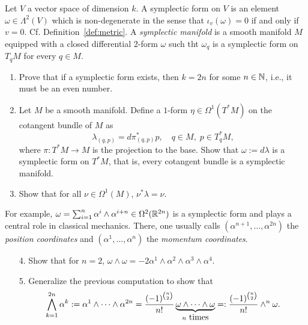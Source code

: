 \begin{exercise}\label{exe:symplectic}
  Let $V$ a vector space of dimension $k$.
  A symplectic form on $V$ is an element $\omega\in\Lambda^2(V)$ which is non-degenerate in the sense that $\iota_v(\omega) = 0$ if and only if $v=0$.
  Cf. Definition~\ref{def:metric}.
  A \emph{symplectic manifold} is a smooth manifold $M$ equipped with a closed differential 2-form $\omega$ such tht $\omega_q$ is a symplectic form on $T_q M$ for every $q\in M$.
  \begin{enumerate}
    \item Prove that if a symplectic form exists, then $k=2n$ for some $n\in\mathbb{N}$, i.e., it must be an even number.
    \item Let $M$ be a smooth manifold. Define a $1$-form $\eta\in\Omega^1(T^*M)$ on the cotangent bundle of $M$ as
          \begin{equation}
            \lambda_{(q,p)} = d\pi_{(q,p)}^*p,
            \quad
            q\in M, \;
            p\in T_q^*M,
          \end{equation}
          where $\pi:T^*M\to M$ is the projection to the base.
          Show that $\omega := d\lambda$ is a symplectic form on $T^* M$, that is, every cotangent bundle is a symplectic manifold.
    \item Show that for all $\nu \in \Omega^1(M)$, $\nu^* \lambda = \nu$.
  \end{enumerate}

  For example, $\omega = \sum_{i=1}^n \alpha^i\wedge \alpha^{i+n}\in\Omega^2(\mathbb{R}^{2n})$ is a symplectic form and plays a central role in classical mechanics. There, one usually calls $(\alpha^{n+1},\ldots,\alpha^{2n})$ the \emph{position coordinates} and $(\alpha^{1},\ldots,\alpha^{n})$ the \emph{momentum coordinates}.
  \begin{enumerate}
    \item[4.] Show that for $n=2$, $\omega \wedge \omega = -2 \alpha^1\wedge\alpha^2\wedge\alpha^3\wedge\alpha^4$.

    \item[5.] Generalize the previous computation to show that
      \begin{equation}
        \bigwedge_{k=1}^{2n} \alpha^k := \alpha^1\wedge\cdots\wedge\alpha^{2n} = \frac{(-1)^{\binom{n}{2}}}{n!} \LaTeXunderbrace{\omega\wedge\cdots\wedge\omega}_{n\mbox{ times}} =: \frac{(-1)^{\binom{n}{2}}}{n!} \wedge^{n} \omega.
      \end{equation}
  \end{enumerate}
\end{exercise}

